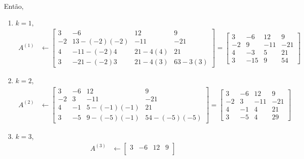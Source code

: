 \documentclass[a4paper,12pt, leqno, answers]{exam}
\begin{document}
\begin{questions}
\begin{solution}
        Ent\~{a}o,
        \begin{enumerate}
            \item $k = 1$,
                \begin{align*}
                    A^{(1)} &\leftarrow \begin{bmatrix}
                        3 & -6 & 12 & 9 \\
                        -2 & 13 - (-2)(-2) & -11 & -21 \\
                        4 & -11 - (-2)4 & 21 - 4(4) & 21 \\
                        3 & -21 -(-2)3 & 21 - 4(3) & 63 - 3(3)
                    \end{bmatrix} = \begin{bmatrix}
                        3 & -6 & 12 & 9 \\
                        -2 & 9 & -11 & -21 \\
                        4 & -3 & 5 & 21 \\
                        3 & -15 & 9 & 54
                    \end{bmatrix}
                \end{align*}
            \item $k = 2$,
                \begin{align*}
                    A^{(2)} &\leftarrow \begin{bmatrix}
                        3 & -6 & 12 & 9 \\
                        -2 & 3 & -11 & -21 \\
                        4 & -1 & 5 - (-1)(-1) & 21 \\
                        3 & -5 & 9 - (-5)(-1) & 54 - (-5)(-5)
                    \end{bmatrix} = \begin{bmatrix}
                        3 & -6 & 12 & 9 \\
                        -2 & 3 & -11 & -21 \\
                        4 & -1 & 4 & 21 \\
                        3 & -5 & 4 & 29
                    \end{bmatrix}
                \end{align*}
           \item  $k = 3$,
               \begin{align*}
                   A^{(3)} &\leftarrow \begin{bmatrix}
                        3 & -6 & 12 & 9 \\

\end{bmatrix}
\end{align*}
\end{enumerate}
\end{solution}
\end{questions}
\end{document}
